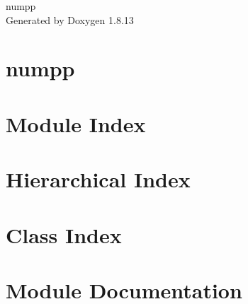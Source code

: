 \documentclass[twoside]{book}
\newcommand{\+}{\discretionary{\mbox{\scriptsize$\hookleftarrow$}}{}{}}
\newcommand{\clearemptydoublepage}{%
  \newpage{\pagestyle{empty}\cleardoublepage}%
}
\begin{document}
\hypersetup{pageanchor=false,
             bookmarksnumbered=true,
             pdfencoding=unicode
            }
\begin{titlepage}
\vspace*{7cm}
\begin{center}%
{\Large numpp }\\
\vspace*{1cm}
{\large Generated by Doxygen 1.8.13}\\
\end{center}
\end{titlepage}
\clearemptydoublepage
{}
\tableofcontents
\clearemptydoublepage
{}
\hypersetup{pageanchor=true}

\chapter{numpp}
\label{md_README}

\chapter{Module Index}

\chapter{Hierarchical Index}

\chapter{Class Index}

\chapter{Module Documentation}
















\end{document}
